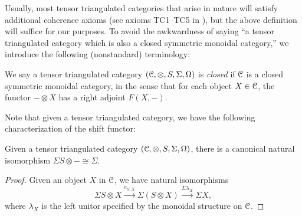 \documentclass[../main.tex]{subfiles}
\begin{document}
Usually, most tensor triangulated categories that arise in nature will satisfy additional coherence axioms (see axioms TC1--TC5 in \cite{MayTri}), but the above definition will suffice for our purposes. To avoid the awkwardness of saying ``a tensor triangulated category which is also a closed symmetric monoidal category,'' we introduce the following (nonstandard) terminology:

\begin{definition}\label{closed_tentri}
    We say a tensor triangulated category $(\mathcal C,\otimes,S,\Sigma,\Omega)$ is \emph{closed} if $\mathcal C$ is a closed symmetric monoidal category, in the sense that for each object $X\in\mathcal C$, the functor $-\otimes X$ has a right adjoint $F(X,-)$.
\end{definition}

Note that given a tensor triangulated category, we have the following characterization of the shift functor:

\begin{proposition}\label{tentri_characterize_shift}
    Given a tensor triangulated category $(\mathcal C,\otimes,S,\Sigma,\Omega)$, there is a canonical natural isomorphism $\Sigma S\otimes -\cong\Sigma$. 
\end{proposition}
\begin{proof}
    Given an object $X$ in $\mathcal C$, we have natural isomorphisms
    \[\Sigma S\otimes X\xrightarrow{e_{S,X}}\Sigma(S\otimes X)\xrightarrow{\Sigma\lambda_X}\Sigma X,\]
    where $\lambda_X$ is the left unitor specified by the monoidal structure on $\mathcal C$.
\end{proof}
\end{document}
